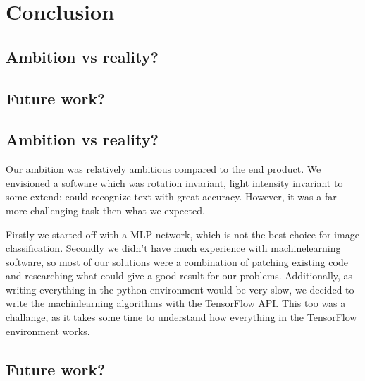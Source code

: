 \documentclass[Report.tex]{subfiles}
\begin{document}
\chapter{Conclusion}
\label{chap:Conclusion}
\section{Ambition vs reality?}
\section{Future work?}


\section{Ambition vs reality?}
Our ambition was relatively ambitious compared to the end product. We envisioned
a software which was rotation invariant, light intensity invariant to some
extend; could recognize text with great accuracy. However, it was a far more
challenging task then what we expected. \par
Firstly we started off with a MLP network, which is not the best choice for
image classification. Secondly we didn't have much experience with
machinelearning software, so most of our solutions were a combination of
patching existing code and researching what could give a good result for
our problems. Additionally, as writing everything in the python environment
would be very slow, we decided to write the machinlearning algorithms with the
TensorFlow API. This too was a challange, as it takes some time to understand
how everything in the TensorFlow environment works.


\section{Future work?}
\end{document}
